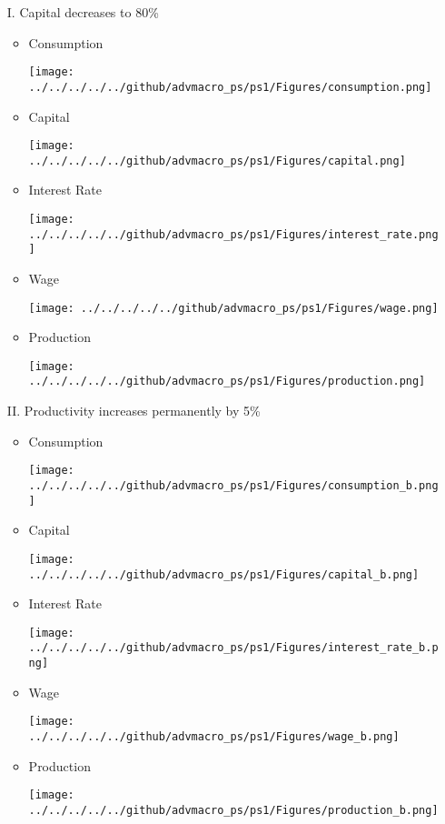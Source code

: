 \documentclass[a4paper]{article}
\begin{document}
\begin{enumerate}
\begin{enumerate}
\item[I.] Capital decreases to 80\%
\begin{itemize}
\item Consumption
\begin{center}
\texttt{[image: ../../../../../github/advmacro\_ps/ps1/Figures/consumption.png]} 
\end{center}
\clearpage
\item Capital
\begin{center}
\texttt{[image: ../../../../../github/advmacro\_ps/ps1/Figures/capital.png]} 
\end{center}
\item Interest Rate
\begin{center}
\texttt{[image: ../../../../../github/advmacro\_ps/ps1/Figures/interest\_rate.png]} 
\end{center}
\item Wage
\begin{center}
\texttt{[image: ../../../../../github/advmacro\_ps/ps1/Figures/wage.png]} 
\end{center}
\clearpage
\item Production
\begin{center}
\texttt{[image: ../../../../../github/advmacro\_ps/ps1/Figures/production.png]} 
\end{center}

\end{itemize}

\item[II.] Productivity increases permanently by 5\%
\begin{itemize}
\item Consumption
\begin{center}
\texttt{[image: ../../../../../github/advmacro\_ps/ps1/Figures/consumption\_b.png]} 
\end{center}
\item Capital
\begin{center}
\texttt{[image: ../../../../../github/advmacro\_ps/ps1/Figures/capital\_b.png]} 
\end{center}
\clearpage
\item Interest Rate
\begin{center}
\texttt{[image: ../../../../../github/advmacro\_ps/ps1/Figures/interest\_rate\_b.png]} 
\end{center}
\item Wage
\begin{center}
\texttt{[image: ../../../../../github/advmacro\_ps/ps1/Figures/wage\_b.png]} 
\end{center}
\item Production
\begin{center}
\texttt{[image: ../../../../../github/advmacro\_ps/ps1/Figures/production\_b.png]} 
\end{center}


\end{itemize}
\end{enumerate}
\end{enumerate}
\end{document}
